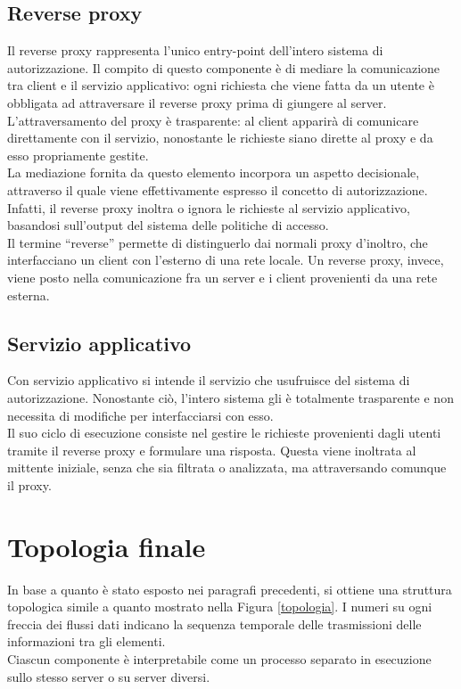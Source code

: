 \subsection{Reverse proxy}
Il reverse proxy rappresenta l'unico entry-point dell'intero sistema di autorizzazione. Il compito di questo componente è di
mediare la comunicazione tra client e il servizio applicativo: ogni richiesta che viene fatta da un utente è obbligata ad attraversare 
il reverse proxy prima di giungere al server. 
\\ L'attraversamento del proxy è trasparente: al client apparirà di comunicare direttamente con il servizio, nonostante le richieste siano dirette al proxy e da esso propriamente gestite. 
\\ La mediazione fornita da questo elemento incorpora un aspetto decisionale, attraverso il quale viene effettivamente espresso il concetto di autorizzazione. 
Infatti, il reverse proxy inoltra o ignora le richieste al servizio applicativo, basandosi sull'output del sistema delle politiche di accesso.  
\\ Il termine ``reverse'' permette di distinguerlo dai normali proxy d'inoltro, che interfacciano un client con l'esterno di una rete locale.
 Un reverse proxy, invece, viene posto nella comunicazione fra un server e i client provenienti da una rete esterna. 
 

\subsection{Servizio applicativo} \label{serv_server}
Con servizio applicativo si intende il servizio che usufruisce del sistema di autorizzazione. 
Nonostante ciò, l'intero sistema gli è totalmente trasparente e non necessita di modifiche per interfacciarsi con esso.
\\Il suo ciclo di esecuzione consiste nel gestire 
le richieste provenienti dagli utenti tramite
 il reverse proxy e formulare una risposta.
Questa viene inoltrata al mittente iniziale, senza che sia filtrata o analizzata, ma attraversando comunque il proxy.

\section{Topologia finale}
In base a quanto è stato esposto nei paragrafi precedenti, si ottiene una struttura topologica simile a quanto mostrato nella Figura \ref{topologia}. 
I numeri su ogni freccia dei flussi dati indicano la sequenza temporale delle trasmissioni delle informazioni tra gli elementi. 
\\Ciascun componente è interpretabile come un processo separato in esecuzione sullo stesso server o su server diversi. 

